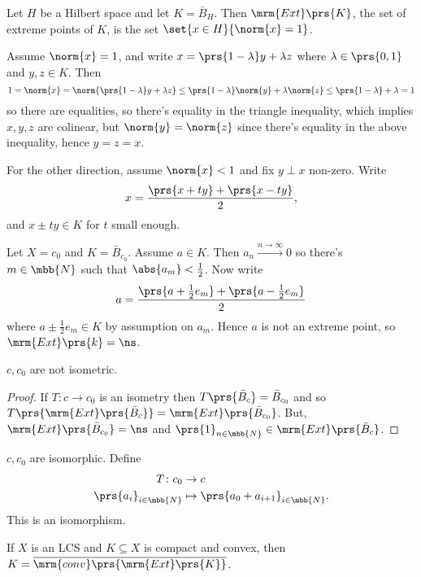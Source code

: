 \documentclass[10pt, twoside]{book}
\begin{document}
\begin{example}
Let $H$ be a Hilbert space and let $K = \bar{B}_{H}$. Then $\mrm{Ext}\prs{K}$, the set of extreme points of $K$, is the set $\set{x \in H}{\norm{x} = 1}$.

Assume $\norm{x} = 1$, and write $x = \prs{1-\lambda} y + \lambda z$ where $\lambda \in \prs{0,1}$ and $y,z \in K$. Then
\[1 = \norm{x} = \norm{\prs{1-\lambda}y + \lambda z} \leq \prs{1-\lambda}\norm{y} + \lambda\norm{z} \leq \prs{1-\lambda} + \lambda = 1\]
so there are equalities, so there's equality in the triangle inequality, which implies $x,y,z$ are colinear, but $\norm{y} = \norm{z}$ since there's equality in the above inequality, hence $y=z=x$.

For the other direction, assume $\norm{x} < 1$ and fix $y \perp x$ non-zero.
Write
\[x = \frac{\prs{x+ty} + \prs{x-ty}}{2} \text{,}\]
and $x\pm ty \in K$ for $t$ small enough.
\end{example}

\begin{example}
Let $X = c_0$ and $K = \bar{B}_{c_0}$. Assume $a \in K$. Then $a_n \xrightarrow{n\to\infty} 0$ so there's $m \in \mbb{N}$ such that $\abs{a_m} < \frac{1}{2}$. Now write
\[a = \frac{\prs{a + \frac{1}{2} e_m} + \prs{a - \frac{1}{2} e_m}}{2}\]
where $a \pm \frac{1}{2} e_m \in K$ by assumption on $a_m$. Hence $a$ is not an extreme point, so $\mrm{Ext}\prs{k} = \ns$.
\end{example}

\begin{corollary}
$c, c_0$ are not isometric.
\end{corollary}

\begin{proof}
If $T \colon c \to c_0$ is an isometry then $T\prs{\bar{B}_c} = \bar{B}_{c_0}$ and so $T\prs{\mrm{Ext}\prs{\bar{B}_c}} = \mrm{Ext}\prs{\bar{B}_{c_0}}$. But, $\mrm{Ext}\prs{\bar{B}_{c_0}} = \ns$ and $\prs{1}_{n \in \mbb{N}} \in \mrm{Ext}\prs{\bar{B}_c}$.
\end{proof}

\begin{remark}
$c, c_0$ are isomorphic. Define
\begin{align*}
T \colon c_0 &\to c \\
\prs{a_i}_{i \in \mbb{N}} &\mapsto \prs{a_0 + a_{i+1}}_{i \in \mbb{N}} \text{.}
\end{align*}
This is an isomorphism.
\end{remark}

\begin{theorem}
If $X$ is an LCS and $K \subseteq X$ is compact and convex, then $K = \overline{\mrm{conv}\prs{\mrm{Ext}\prs{K}}}$.
\end{theorem}
\end{document}
